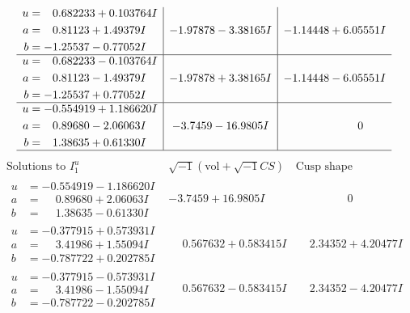\documentclass[1p]{elsarticle_modified}
\theoremstyle{definition}
\newcommand{\I}{\sqrt{-1}}
\begin{document}
$$\begin{array}{c|c|c}
\begin{aligned}
u &= \phantom{-}0.682233 + 0.103764 I \\
a &= \phantom{-}0.81123 + 1.49379 I \\
b &= -1.25537 - 0.77052 I\end{aligned}
 & -1.97878 - 3.38165 I & -1.14448 + 6.05551 I \\ \hline\begin{aligned}
u &= \phantom{-}0.682233 - 0.103764 I \\
a &= \phantom{-}0.81123 - 1.49379 I \\
b &= -1.25537 + 0.77052 I\end{aligned}
 & -1.97878 + 3.38165 I & -1.14448 - 6.05551 I \\ \hline\begin{aligned}
u &= -0.554919 + 1.186620 I \\
a &= \phantom{-}0.89680 - 2.06063 I \\
b &= \phantom{-}1.38635 + 0.61330 I\end{aligned}
 & -3.7459 - 16.9805 I & \phantom{-0.000000 } 0\\
 \hline 
 \end{array}$$\newpage$$\begin{array}{c|c|c}  
\text{Solutions to }I^u_{1}& \I (\text{vol} + \sqrt{-1}CS) & \text{Cusp shape}\\
 \hline 
\begin{aligned}
u &= -0.554919 - 1.186620 I \\
a &= \phantom{-}0.89680 + 2.06063 I \\
b &= \phantom{-}1.38635 - 0.61330 I\end{aligned}
 & -3.7459 + 16.9805 I & \phantom{-0.000000 } 0 \\ \hline\begin{aligned}
u &= -0.377915 + 0.573931 I \\
a &= \phantom{-}3.41986 + 1.55094 I \\
b &= -0.787722 + 0.202785 I\end{aligned}
 & \phantom{-}0.567632 + 0.583415 I & \phantom{-}2.34352 + 4.20477 I \\ \hline\begin{aligned}
u &= -0.377915 - 0.573931 I \\
a &= \phantom{-}3.41986 - 1.55094 I \\
b &= -0.787722 - 0.202785 I\end{aligned}
 & \phantom{-}0.567632 - 0.583415 I & \phantom{-}2.34352 - 4.20477 I \\ \hline\begin{aligned}

\end{aligned}
\end{array}$$
\end{document}
